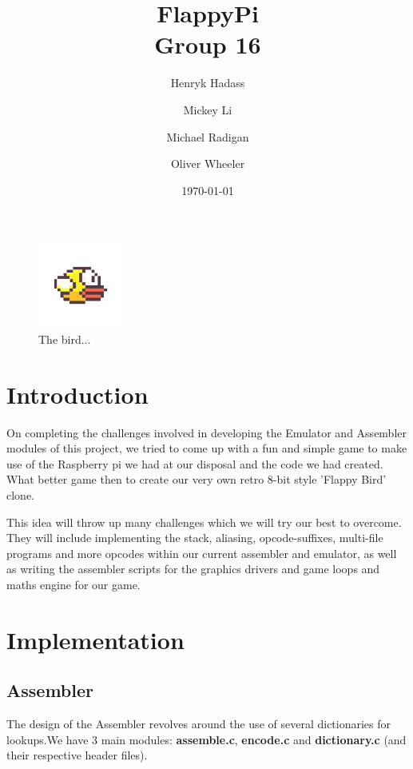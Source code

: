 \documentclass[11pt]{article}
\begin{document}
\title{
	{\huge\textbf{FlappyPi}} \\		
	Group 16
	}

\author{Henryk Hadass \and Mickey Li \and Michael Radigan \and Oliver Wheeler}
\date{\today}
\maketitle


\tableofcontents

\begin{figure}
  \vspace{-10pt}
  \begin{center}
    \includegraphics[width=0.25\textwidth]{flappyBird.png}
  \end{center}
  \vspace{-30pt}
  \caption{The bird...}
  \vspace{-10pt}
\end{figure}
\section{Introduction}
On completing the challenges involved in developing the Emulator and Assembler modules of this project, we tried to come up with a fun and simple game to make use of the Raspberry pi we had at our disposal and the code we had created. What better game then to create our very own retro 8-bit style 'Flappy Bird' clone.

This idea will throw up many challenges which we will try our best to overcome. They will include implementing the stack, aliasing, opcode-suffixes, multi-file programs and more opcodes within our current assembler and emulator, as well as writing the assembler scripts for the graphics drivers and game loops and maths engine for our game. 


\pagebreak

\section{Implementation}

\subsection{Assembler}
The design of the Assembler revolves around the use of several dictionaries for lookups.We have 3 main modules: \textbf{assemble.c}, \textbf{encode.c} and \textbf{dictionary.c} (and their respective header files).
\end{document}
